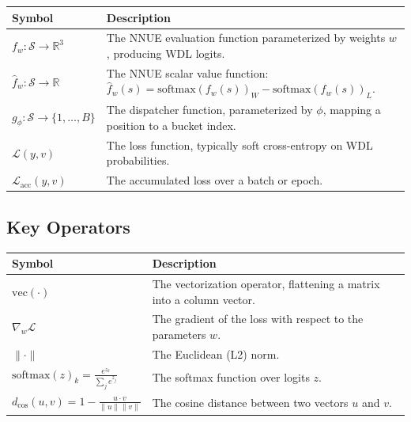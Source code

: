 \begin{center}
\small
\begin{tabularx}{\textwidth}{@{}>{\raggedright\arraybackslash}p{} X@{}}
\hline
\textbf{Symbol} & \textbf{Description} \\
\hline
\(f_w: \mathcal{S} \rightarrow \mathbb{R}^3\) &
  The NNUE evaluation function parameterized by weights \(w\), producing WDL logits. \\
\(\hat{f}_w: \mathcal{S} \rightarrow \mathbb{R}\) &
  The NNUE scalar value function: \(\hat{f}_w(s) = \mathrm{softmax}(f_w(s))_W - \mathrm{softmax}(f_w(s))_L\). \\
\(g_\phi: \mathcal{S} \rightarrow \{1, \dots, B\}\) &
  The dispatcher function, parameterized by \(\phi\), mapping a position to a bucket index. \\
\(\mathcal{L}(y, v)\) &
  The loss function, typically soft cross-entropy on WDL probabilities. \\
\(\mathcal{L}_{\mathrm{acc}}(y, v)\) &
  The accumulated loss over a batch or epoch. \\
\hline
\end{tabularx}
\end{center}

\subsection{Key Operators}\label{sec:notation-operators}

\begin{center}
\small
\begin{tabularx}{\textwidth}{@{}>{\raggedright\arraybackslash}p{} X@{}}
\hline
\textbf{Symbol} & \textbf{Description} \\
\hline
\(\mathrm{vec}(\cdot)\) &
  The vectorization operator, flattening a matrix into a column vector. \\
\(\nabla_w \mathcal{L}\) &
  The gradient of the loss with respect to the parameters \(w\). \\
\(\lVert \cdot \rVert\) &
  The Euclidean (L2) norm. \\
\(\mathrm{softmax}(z)_k = \frac{e^{z_k}}{\sum_j e^{z_j}}\) &
  The softmax function over logits \(z\). \\
\(d_{\mathrm{cos}}(u, v) = 1 - \frac{u \cdot v}{\lVert u\rVert \lVert v\rVert}\) &
  The cosine distance between two vectors \(u\) and \(v\). \\
\hline
\end{tabularx}
\end{center}

